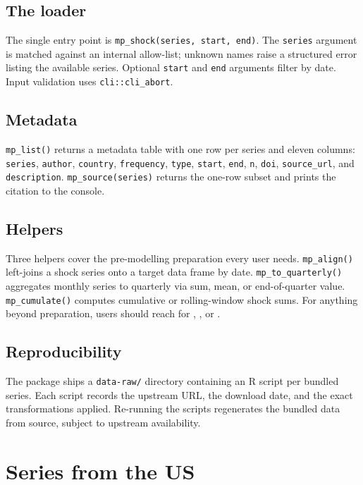 \subsection{The loader}\label{the-loader}

The single entry point is \texttt{mp\_shock(series,\ start,\ end)}. The \texttt{series} argument is matched against an internal allow-list; unknown names raise a structured error listing the available series. Optional \texttt{start} and \texttt{end} arguments filter by date. Input validation uses \texttt{cli::cli\_abort}.

\subsection{Metadata}\label{metadata}

\texttt{mp\_list()} returns a metadata table with one row per series and eleven columns: \texttt{series}, \texttt{author}, \texttt{country}, \texttt{frequency}, \texttt{type}, \texttt{start}, \texttt{end}, \texttt{n}, \texttt{doi}, \texttt{source\_url}, and \texttt{description}. \texttt{mp\_source(series)} returns the one-row subset and prints the citation to the console.

\subsection{Helpers}\label{helpers}

Three helpers cover the pre-modelling preparation every user needs. \texttt{mp\_align()} left-joins a shock series onto a target data frame by date. \texttt{mp\_to\_quarterly()} aggregates monthly series to quarterly via sum, mean, or end-of-quarter value. \texttt{mp\_cumulate()} computes cumulative or rolling-window shock sums. For anything beyond preparation, users should reach for , , or .

\subsection{Reproducibility}\label{reproducibility}

The package ships a \texttt{data-raw/} directory containing an R script per bundled series. Each script records the upstream URL, the download date, and the exact transformations applied. Re-running the scripts regenerates the bundled data from source, subject to upstream availability.

\section{Series from the US}\label{series-from-the-us}

